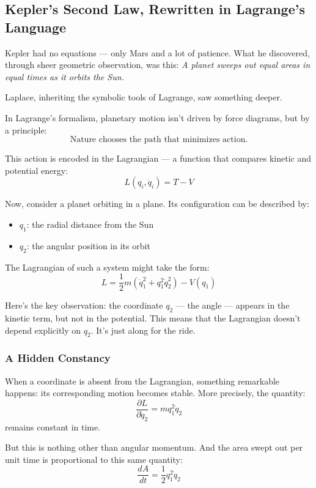     \subsection{Kepler’s Second Law, Rewritten in Lagrange’s Language}

Kepler had no equations — only Mars and a lot of patience.  
What he discovered, through sheer geometric observation, was this:  
\textit{A planet sweeps out equal areas in equal times as it orbits the Sun.}

Laplace, inheriting the symbolic tools of Lagrange, saw something deeper.

\medskip

In Lagrange’s formalism, planetary motion isn’t driven by force diagrams, but by a principle:
\[
\text{Nature chooses the path that minimizes action.}
\]

This action is encoded in the Lagrangian — a function that compares kinetic and potential energy:
\[
L(q_i, \dot{q}_i) = T - V
\]

Now, consider a planet orbiting in a plane. Its configuration can be described by:
\begin{itemize}
    \item \( q_1 \): the radial distance from the Sun
    \item \( q_2 \): the angular position in its orbit
\end{itemize}

The Lagrangian of such a system might take the form:
\[
L = \frac{1}{2} m \left( \dot{q}_1^2 + q_1^2 \dot{q}_2^2 \right) - V(q_1)
\]

Here’s the key observation: the coordinate \( q_2 \) — the angle — appears in the kinetic term, but not in the potential.  
This means that the Lagrangian doesn’t depend explicitly on \( q_2 \). It’s just along for the ride.

\subsubsection*{A Hidden Constancy}

When a coordinate is absent from the Lagrangian, something remarkable happens: its corresponding motion becomes stable.  
More precisely, the quantity:
\[
\frac{\partial L}{\partial \dot{q}_2} = m q_1^2 \dot{q}_2
\]
remains constant in time.

But this is nothing other than angular momentum. And the area swept out per unit time is proportional to this same quantity:
\[
\frac{dA}{dt} = \frac{1}{2} q_1^2 \dot{q}_2
\]

